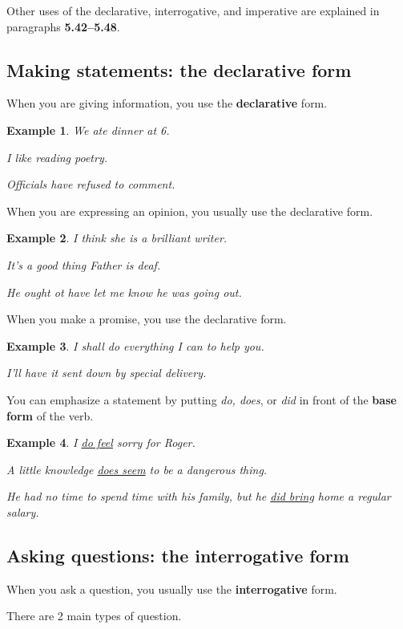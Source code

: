 \documentclass[oneside]{book}
\numberwithin{equation}{section}
\newtheorem{example}{Example}[section]
\begin{document}
%
Other uses of the declarative, interrogative, and imperative are explained in paragraphs \textbf{5.42--5.48}.

\subsection{Making statements: the declarative form}
\noindent{} When you are giving information, you use the \textbf{declarative} form.
\begin{example}
    We ate dinner at 6.
    
    I like reading poetry.
    
    Officials have refused to comment.
\end{example}
%
\noindent{} When you are expressing an opinion, you usually use the declarative form.
\begin{example}
    I think she is a brilliant writer.
    
    It's a good thing Father is deaf.
    
    He ought ot have let me know he was going out.
\end{example}
%
\noindent{} When you make a promise, you use the declarative form.
\begin{example}
    I shall do everything I can to help you.
    
    I'll have it sent down by special delivery.
\end{example}
%
\noindent{} You can emphasize a statement by putting \textit{do, does}, or \textit{did} in front of the \textbf{base form} of the verb.
\begin{example}
   I \underline{do feel} sorry for Roger.
   
   A little knowledge \underline{does seem} to be a dangerous thing.
   
   He had no time to spend time with his family, but he \underline{did bring} home a regular salary.
\end{example}

\subsection{Asking questions: the interrogative form}
\noindent{} When you ask a question, you usually use the \textbf{interrogative} form.

%
\noindent{} There are 2 main types of question.
\end{document}
